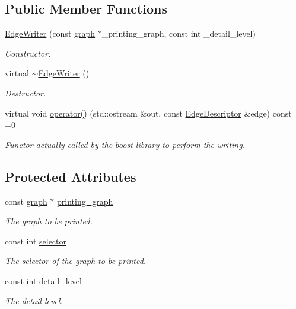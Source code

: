 \subsection*{Public Member Functions}
\begin{DoxyCompactItemize}
\item 
\hyperlink{classEdgeWriter_a48548d050674877665360af8f9a9842a}{Edge\+Writer} (const \hyperlink{structgraph}{graph} $\ast$\+\_\+printing\+\_\+graph, const int \+\_\+detail\+\_\+level)
\begin{DoxyCompactList}\small\item\em Constructor. \end{DoxyCompactList}\item 
virtual \hyperlink{classEdgeWriter_a6b5960848a2b661fedc561861e0968c9}{$\sim$\+Edge\+Writer} ()
\begin{DoxyCompactList}\small\item\em Destructor. \end{DoxyCompactList}\item 
virtual void \hyperlink{classEdgeWriter_a04dc5b68a11dcf253e21d29dfd1e06c3}{operator()} (std\+::ostream \&out, const \hyperlink{graph_8hpp_a9eb9afea34e09f484b21f2efd263dd48}{Edge\+Descriptor} \&edge) const =0
\begin{DoxyCompactList}\small\item\em Functor actually called by the boost library to perform the writing. \end{DoxyCompactList}\end{DoxyCompactItemize}
\subsection*{Protected Attributes}
\begin{DoxyCompactItemize}
\item 
const \hyperlink{structgraph}{graph} $\ast$ \hyperlink{classEdgeWriter_a04cea5d80a335d20f8327b5cfb9a0dff}{printing\+\_\+graph}
\begin{DoxyCompactList}\small\item\em The graph to be printed. \end{DoxyCompactList}\item 
const int \hyperlink{classEdgeWriter_a22c5d5b4e78561eba39818b30d2213e0}{selector}
\begin{DoxyCompactList}\small\item\em The selector of the graph to be printed. \end{DoxyCompactList}\item 
const int \hyperlink{classEdgeWriter_a74d56c5b98f85a8141d854cfb392e553}{detail\+\_\+level}
\begin{DoxyCompactList}\small\item\em The detail level. \end{DoxyCompactList}\end{DoxyCompactItemize}


